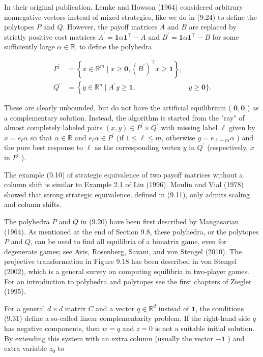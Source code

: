 \documentclass[12pt]{article}
\begin{document}
In their original publication, Lemke and Howson (1964) considered arbitrary nonnegative vectors instead of mixed strategies, like we do in (9.24) to define the polytopes $P$ and $Q$. However, the payoff matrices $A$ and $B$ are replaced by strictly positive cost matrices $A^{\prime}=\mathbf{1} \alpha \mathbf{1}^{\top}-A$ and $B^{\prime}=\mathbf{1} \alpha \mathbf{1}^{\top}-B$ for some sufficiently large $\alpha \in \mathbb{R}$, to define the polyhedra

$$
\begin{array}{rlr}
P^{\prime} & =\left\{x \in \mathbb{R}^{m} \mid x \geq \mathbf{0},\left(B^{\prime}\right)^{\top} x \geq \mathbf{1}\right\}, \\
Q^{\prime} & =\left\{y \in \mathbb{R}^{n} \mid A^{\prime} y \geq \mathbf{1},\right. & y \geq \mathbf{0}\} .
\end{array}
$$

These are clearly unbounded, but do not have the artificial equilibrium ( $\mathbf{0}, \mathbf{0}$ ) as a complementary solution. Instead, the algorithm is started from the "ray" of almost completely labeled pairs $(x, y) \in P^{\prime} \times Q^{\prime}$ with missing label $\ell$ given by $x=e_{\ell} \alpha$ so that $\alpha \in \mathbb{R}$ and $e_{\ell} \alpha \in P^{\prime}$ (if $1 \leq \ell \leq m$, otherwise $y=e_{\ell-m} \alpha$ ) and the pure best response to $\ell$ as the corresponding vertex $y$ in $Q^{\prime}$ (respectively, $x$ in $P^{\prime}$ ).

The example (9.10) of strategic equivalence of two payoff matrices without a column shift is similar to Example 2.1 of Liu (1996). Moulin and Vial (1978) showed that strong strategic equivalence, defined in (9.11), only admits scaling and column shifts.

The polyhedra $\bar{P}$ and $\bar{Q}$ in (9.20) have been first described by Mangasarian (1964). As mentioned at the end of Section 9.8, these polyhedra, or the polytopes $P$ and $Q$, can be used to find all equilibria of a bimatrix game, even for degenerate games; see Avis, Rosenberg, Savani, and von Stengel (2010). The projective transformation in Figure 9.18 has been described in von Stengel (2002), which is a general survey on computing equilibria in two-player games. For an introduction to polyhedra and polytopes see the first chapters of Ziegler (1995).

For a general $d \times d$ matrix $C$ and a vector $q \in \mathbb{R}^{d}$ instead of $\mathbf{1}$, the conditions (9.31) define a so-called linear complementarity problem. If the right-hand side $q$ has negative components, then $w=q$ and $z=0$ is not a suitable initial solution. By extending this system with an extra column (usually the vector $\mathbf{- 1}$ ) and extra variable $z_{0}$ to
\end{document}
